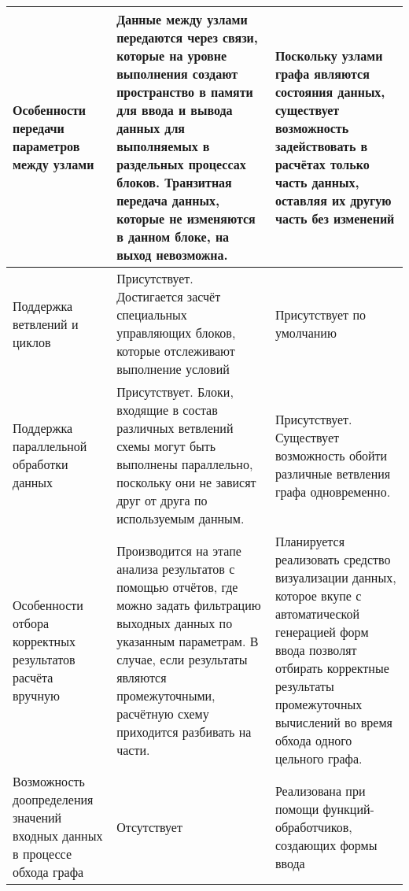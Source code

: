 \begin{longtable}{|p{3.5cm}|p{6.5cm}|p{6.5cm}|}
    \hline
    Особенности передачи параметров между узлами & Данные между узлами передаются через связи, которые на уровне выполнения создают пространство в памяти для ввода и вывода данных для выполняемых в раздельных процессах блоков.  Транзитная передача данных, которые не изменяются в данном блоке, на выход невозможна. & Поскольку узлами графа являются состояния данных, существует возможность задействовать в расчётах только часть данных, оставляя их другую часть без изменений \\
    \hline
    Поддержка ветвлений и циклов & Присутствует. Достигается засчёт специальных управляющих блоков, которые отслеживают выполнение условий & Присутствует по умолчанию\\
    \hline
    Поддержка параллельной обработки данных & Присутствует. Блоки, входящие в состав различных ветвлений схемы могут быть выполнены параллельно, поскольку они не зависят друг от друга по используемым данным. & Присутствует. Существует возможность обойти различные ветвления графа одновременно.\\
    \hline
    Особенности отбора корректных результатов расчёта вручную & Производится на этапе анализа результатов с помощью отчётов, где можно задать фильтрацию выходных данных по указанным параметрам. В случае, если результаты являются промежуточными, расчётную схему приходится разбивать на части. & Планируется реализовать средство визуализации данных, которое вкупе с автоматической генерацией форм ввода позволят отбирать корректные результаты промежуточных вычислений во время обхода одного цельного графа. \\
    \hline
    Возможность доопределения значений входных данных в процессе обхода графа & Отсутствует & Реализована при помощи функций-обработчиков, создающих формы ввода \\
    \hline
\end{longtable}

